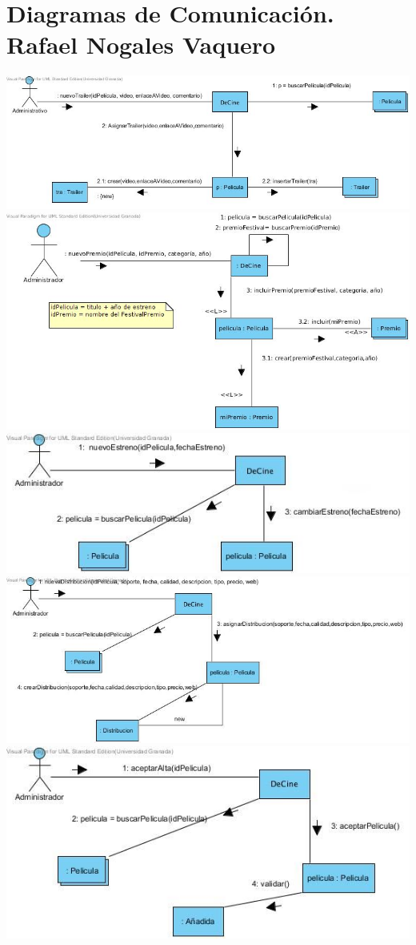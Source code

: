 \documentclass{article}
\begin{document}
\section{Diagramas de Comunicación. Rafael Nogales Vaquero}
\includegraphics[width=1.3\linewidth]{./R-1}
\includegraphics[width=1.3\linewidth]{./R-2}
\includegraphics[width=1.3\linewidth]{./R-3}
\includegraphics[width=1.3\linewidth]{./R-4}
\includegraphics[width=1.3\linewidth]{./R-5}
\end{document}
